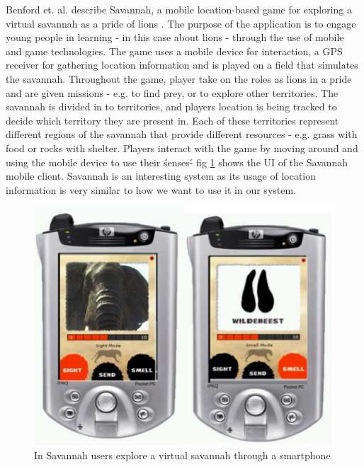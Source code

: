 Benford et. al. describe Savannah, a mobile location-based game for exploring a virtual savannah as a pride of lions \cite{Benford_Rowland_Hull_Reid_Morrison_Facer_Clayton_2004}. The purpose of the application is to engage young people in learning - in this case about lions - through the use of mobile and game technologies. The game uses a mobile device for interaction, a GPS receiver for gathering location information and is played on a field that simulates the savannah. Throughout the game, player take on the roles as lions in a pride and are given missions - e.g. to find prey, or to explore other territories. The savannah is divided in to territories, and players location is being tracked to decide which territory they are present in. Each of these territories represent different regions of the savannah that provide different resources - e.g. grass with food or rocks with shelter. Players interact with the game by moving around and using the mobile device to use their \'senses\' - fig \ref{fig:savannah} shows the UI of the Savannah mobile client. Savannah is an interesting system as its usage of location information is very similar to how we want to use it in our system.

\begin{figure}
	\centering
	\includegraphics[scale=0.6]{fig/savannah}
	\caption{In Savannah \cite{Benford_Rowland_Hull_Reid_Morrison_Facer_Clayton_2004} users explore a virtual savannah through a smartphone}
	\label{fig:savannah}
\end{figure}

